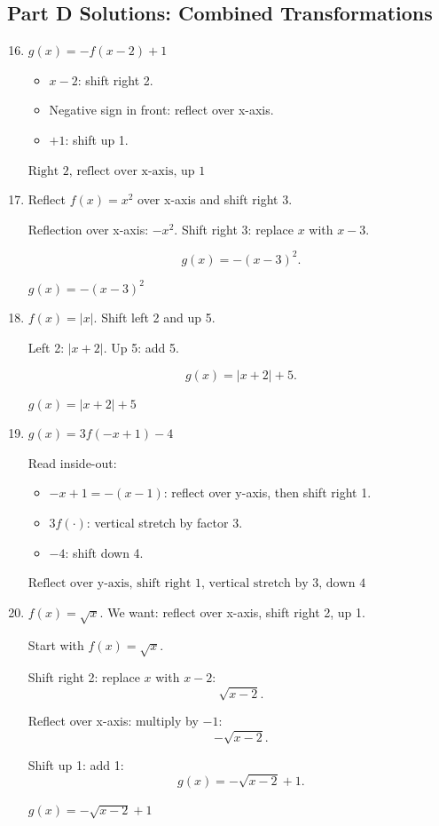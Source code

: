 \documentclass[14pt]{extarticle}
\begin{document}
\subsection*{Part D Solutions: Combined Transformations}
\begin{enumerate}
  \setcounter{enumi}{15}
  \item \(g(x) = -f(x - 2) + 1\)

  \begin{itemize}
    \item \(x - 2\): shift right 2.
    \item Negative sign in front: reflect over x-axis.
    \item \(+1\): shift up 1.
  \end{itemize}

  \(\boxed{\text{Right 2, reflect over x-axis, up 1}}\)

  \item Reflect \(f(x) = x^2\) over x-axis and shift right 3.

  Reflection over x-axis: \(-x^2.\)  
  Shift right 3: replace \(x\) with \(x - 3\).

  \[
  g(x) = -(x - 3)^2.
  \]

  \(\boxed{g(x) = -(x - 3)^2}\)

  \item \(f(x) = |x|\). Shift left 2 and up 5.

  Left 2: \(|x + 2|\).  
  Up 5: add 5.

  \[
  g(x) = |x + 2| + 5.
  \]

  \(\boxed{g(x) = |x + 2| + 5}\)

  \item \(g(x) = 3f(-x + 1) - 4\)

  Read inside-out:
  \begin{itemize}
    \item \(-x + 1 = -(x - 1)\): reflect over y-axis, then shift right 1.
    \item \(3f(\cdot)\): vertical stretch by factor 3.
    \item \(-4\): shift down 4.
  \end{itemize}

  \(\boxed{\text{Reflect over y-axis, shift right 1, vertical stretch by 3, down 4}}\)

  \item \(f(x) = \sqrt{x}\). We want: reflect over x-axis, shift right 2, up 1.

  Start with \(f(x) = \sqrt{x}\).

  Shift right 2: replace \(x\) with \(x - 2\):
  \[
  \sqrt{x - 2}.
  \]

  Reflect over x-axis: multiply by \(-1\):
  \[
  -\sqrt{x - 2}.
  \]

  Shift up 1: add 1:
  \[
  g(x) = -\sqrt{x - 2} + 1.
  \]

  \(\boxed{g(x) = -\sqrt{x - 2} + 1}\)
\end{enumerate}
\end{document}
